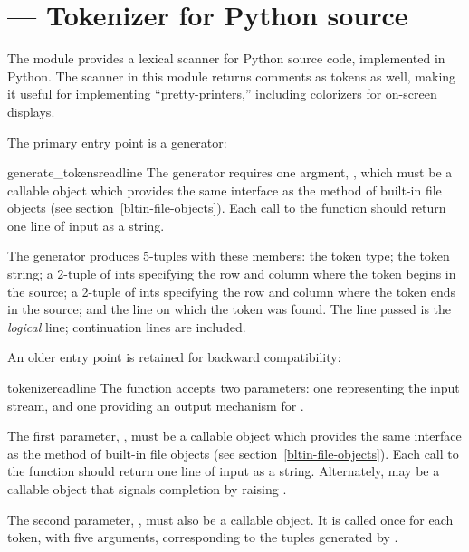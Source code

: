 \section{ ---
         Tokenizer for Python source}



The  module provides a lexical scanner for Python
source code, implemented in Python.  The scanner in this module
returns comments as tokens as well, making it useful for implementing
``pretty-printers,'' including colorizers for on-screen displays.

The primary entry point is a generator:

\begin{funcdesc}{generate_tokens}{readline}
  The  generator requires one argment,
  , which must be a callable object which
  provides the same interface as the  method of
  built-in file objects (see section~\ref{bltin-file-objects}).  Each
  call to the function should return one line of input as a string.

  The generator produces 5-tuples with these members:
  the token type;
  the token string;
  a 2-tuple  of ints specifying the
  row and column where the token begins in the source;
  a 2-tuple  of ints specifying the
  row and column where the token ends in the source;
  and the line on which the token was found.
  The line passed is the \emph{logical} line;
  continuation lines are included.
\end{funcdesc}

An older entry point is retained for backward compatibility:

\begin{funcdesc}{tokenize}{readline}
  The  function accepts two parameters: one
  representing the input stream, and one providing an output mechanism
  for .

  The first parameter, , must be a callable object which
  provides the same interface as the  method of
  built-in file objects (see section~\ref{bltin-file-objects}).  Each
  call to the function should return one line of input as a string.
  Alternately,  may be a callable object that signals
  completion by raising .

  The second parameter, , must also be a callable
  object.  It is called once for each token, with five arguments,
  corresponding to the tuples generated by .
\end{funcdesc}


